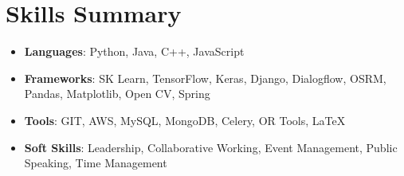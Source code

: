 \documentclass[a4paper,20pt]{article}
\newcommand{\resumeItem}[2]{
	\item\small{
		\textbf{#1}{: #2 \vspace{-2pt}}
	}
}
\newcommand{\resumeSubItem}[2]{\resumeItem{#1}{#2}\vspace{-3pt}}
\newcommand{\resumeSubHeadingListStart}{\begin{itemize}[leftmargin=*]}
\newcommand{\resumeSubHeadingListEnd}{\end{itemize}}
\begin{document}
	
	\section{Skills Summary}
	\resumeSubHeadingListStart
	\resumeSubItem{Languages}{\hspace{0.5cm}Python, Java, C++, JavaScript}
	\resumeSubItem{Frameworks}{\hspace{0.2cm}SK Learn, TensorFlow, Keras, Django, Dialogflow, OSRM, Pandas, Matplotlib, Open CV, Spring}
	\resumeSubItem{Tools}{\hspace{1.3cm}GIT, AWS, MySQL, MongoDB, Celery, OR Tools, LaTeX}
	\resumeSubItem{Soft Skills}{\hspace{0.56cm}Leadership, Collaborative Working, Event Management, Public Speaking, Time Management}
	
	\resumeSubHeadingListEnd
	\vspace{7pt}
	
	
	
	
		
\end{document}
